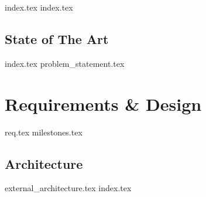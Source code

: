{index.tex}
{index.tex}
\chapter{State of The Art}\label{cha:sota}
{index.tex}
{problem_statement.tex}
\part{Requirements \& Design}
{req.tex}
{milestones.tex}
\chapter{Architecture}
{external_architecture.tex}
{index.tex}
